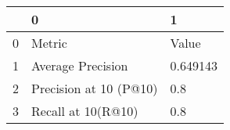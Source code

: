 \begin{tabular}{lll}
\toprule
{} &                       0 &         1 \\
\midrule
0 &                  Metric &     Value \\
1 &       Average Precision &  0.649143 \\
2 &  Precision at 10 (P@10) &       0.8 \\
3 &      Recall at 10(R@10) &       0.8 \\
\bottomrule
\end{tabular}
